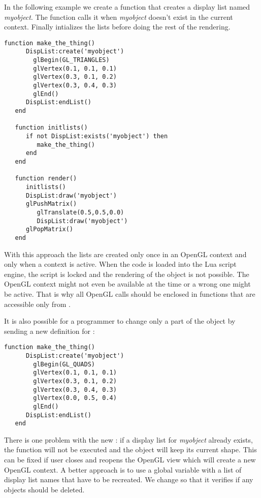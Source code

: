 In the following example we create a function that creates a display list named
{\em myobject}. The function  calls it when {\em myobject}
doesn't exist in the current context. Finally  intializes the
lists before doing the rest of the rendering.

\begin{Verbatim}[fontsize=\scriptsize,gobble=3]
   function make_the_thing()
      DispList:create('myobject')
        glBegin(GL_TRIANGLES)
        glVertex(0.1, 0.1, 0.1)
        glVertex(0.3, 0.1, 0.2)
        glVertex(0.3, 0.4, 0.3)
        glEnd()
      DispList:endList()
   end

   function initlists()
      if not DispList:exists('myobject') then
         make_the_thing()
      end
   end

   function render()
      initlists()
      DispList:draw('myobject')
      glPushMatrix()
         glTranslate(0.5,0.5,0.0)
         DispList:draw('myobject')
      glPopMatrix()
   end
\end{Verbatim}

With this approach the lists are created only once in an OpenGL context and
only when a context is active.  When the code is loaded into the Lua script
engine, the script is locked and the rendering of the object is not possible.
The OpenGL context might not even be available at the time or a wrong one might
be active. That is why all OpenGL calls should be enclosed in functions that
are accessible only from .

It is also possible for a programmer to change only a part of the object by
sending a new definition for :

\begin{Verbatim}[fontsize=\scriptsize,gobble=3]
   function make_the_thing()
      DispList:create('myobject')
        glBegin(GL_QUADS)
        glVertex(0.1, 0.1, 0.1)
        glVertex(0.3, 0.1, 0.2)
        glVertex(0.3, 0.4, 0.3)
        glVertex(0.0, 0.5, 0.4)
        glEnd()
      DispList:endList()
   end
\end{Verbatim}

There is one problem with the new : if a display list
for {\em myobject} already exists, the function will not be executed and the
object will keep its current shape. This can be fixed if user closes and
reopens the OpenGL view which will create a new OpenGL context. A better
approach is to use a global variable with a list of display list names that
have to be recreated. We change  so that it verifies if any
objects should be deleted.

